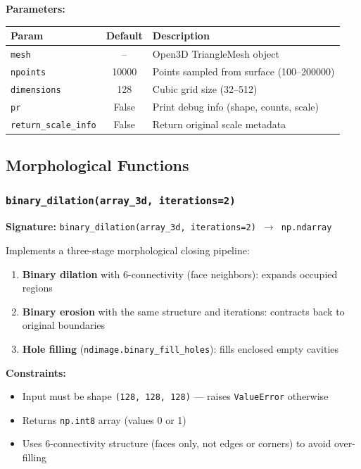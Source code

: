 \documentclass[12pt,a4paper]{article}
\begin{document}
\textbf{Parameters:}
\begin{table}[H]
\centering
\begin{tabular}{lcp{7cm}}
\toprule
\textbf{Param} & \textbf{Default} & \textbf{Description} \\
\midrule
\texttt{mesh} & -- & Open3D TriangleMesh object \\
\texttt{npoints} & 10000 & Points sampled from surface (100--200000) \\
\texttt{dimensions} & 128 & Cubic grid size (32--512) \\
\texttt{pr} & False & Print debug info (shape, counts, scale) \\
\texttt{return\_scale\_info} & False & Return original scale metadata \\
\bottomrule
\end{tabular}
\end{table}

\subsection{Morphological Functions}

\subsubsection{\texttt{binary\_dilation(array\_3d, iterations=2)}}

\textbf{Signature:} \texttt{binary\_dilation(array\_3d, iterations=2) $\rightarrow$ np.ndarray}

Implements a three-stage morphological closing pipeline:

\begin{enumerate}
  \item \textbf{Binary dilation} with 6-connectivity (face neighbors): expands occupied regions
  \item \textbf{Binary erosion} with the same structure and iterations: contracts back to original boundaries
  \item \textbf{Hole filling} (\texttt{ndimage.binary\_fill\_holes}): fills enclosed empty cavities
\end{enumerate}

\textbf{Constraints:}
\begin{itemize}
  \item Input must be shape \texttt{(128, 128, 128)} --- raises \texttt{ValueError} otherwise
  \item Returns \texttt{np.int8} array (values 0 or 1)
  \item Uses 6-connectivity structure (faces only, not edges or corners) to avoid over-filling
\end{itemize}
\end{document}
